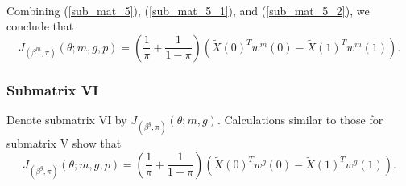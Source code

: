 \documentclass[12pt]{article}
\begin{document}
\begin{appendices}
\begin{refsection}
\begin{multline}
		\end{multline}
		Combining (\ref{sub_mat_5}), (\ref{sub_mat_5_1}), and (\ref{sub_mat_5_2}), we conclude that
		\begin{equation}\label{sub_mat_5_formula} J_{(\beta^m, \pi)}(\theta; m, g, p) = \left( \frac{1}{\pi} + \frac{1}{1 - \pi} \right) \left( \tilde{X}(0)^T w^m(0) - \tilde{X}(1)^T w^m(1)\right). \end{equation}
		
		\subsubsection*{Submatrix VI}
		Denote submatrix VI by $J_{(\beta^g,\pi)}(\theta; m, g).$ Calculations similar to those for submatrix V show that
		\begin{equation}\label{sub_mat_6_formula} J_{(\beta^g, \pi)}(\theta; m, g, p) = \left(\frac{1}{\pi} + \frac{1}{1 - \pi} \right) \left( \tilde{X}(0)^T w^g(0) - \tilde{X}(1)^T w^g(1)\right). \end{equation}
		

\end{refsection}
\end{appendices}
\end{document}
